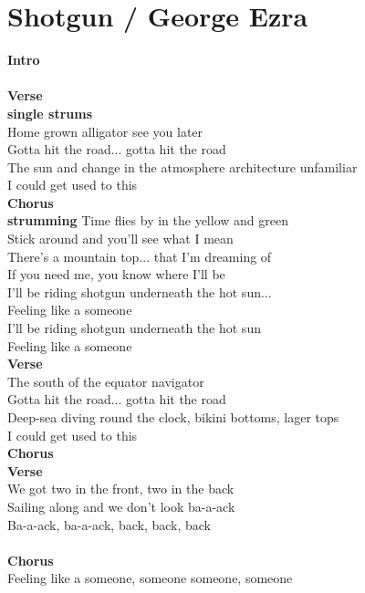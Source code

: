 \section{Shotgun / George Ezra}\label{sec:shotgun}

\Fmajor
\BflatMajor
\Dminor
\Cmajor

\textbf{Intro}\\
   \\
\textbf{Verse}\\
\textbf{single strums}\\
Home grown alligator see you later\\
Gotta hit the road... gotta hit the road\\
The sun and change in the atmosphere architecture unfamiliar\\
 I could get used to this \\
\textbf{Chorus}\\
\textbf{strumming} Time flies by in the yellow and green\\
Stick around and you’ll see what I mean\\
There’s a mountain top... that I’m dreaming of\\
If you need me, you know where I’ll be\\
I’ll be riding shotgun underneath the hot sun...\\
Feeling like a someone \\
I’ll be riding shotgun underneath the hot sun\\
Feeling like a someone \\
\textbf{Verse}\\
The south of the equator navigator\\
Gotta hit the road... gotta hit the road\\
Deep-sea diving round the clock, bikini bottoms, lager tops\\
 I could get used to this \\
\textbf{Chorus}\\
\textbf{Verse}\\
We got two in the front, two in the back\\
Sailing along and we don’t look ba-a-ack\\
Ba-a-ack, ba-a-ack, back, back, back\\
 \\
\textbf{Chorus}\\
Feeling like a someone, someone someone, someone\\
    \\
